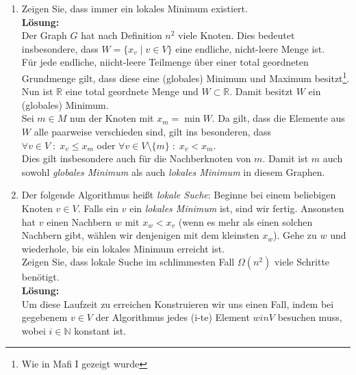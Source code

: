 \documentclass[11pt,a4paper,ngerman]{article}
\begin{document}
\begin{enumerate}[\bfseries (a)]


\item Zeigen Sie, dass immer ein lokales Minimum existiert.\\

\textbf{Lösung:}\\
Der Graph $G$ hat nach Definition $n^2$ viele Knoten. Dies bedeutet insbesondere, dass $W = \{ x_v \; | \; v \in V \}$ eine endliche, nicht-leere Menge ist.\\
Für jede endliche, niicht-leere Teilmenge über einer total geordneten Grundmenge gilt, dass diese eine (globales) Minimum und Maximum besitzt\footnote{Wie in Mafi I gezeigt wurde}. Nun ist $\mathbb{R}$ eine total geordnete Menge und $W \subset \mathbb{R}$. Damit besitzt $W$ ein (globales) Minimum.\\

Sei $m \in M$ nun der Knoten mit $x_m = \min W$. Da gilt, dass die Elemente aus $W$ alle paarweise verschieden sind, gilt ins besonderen, dass\\
$\forall v \in V \; : \; x_v \leq x_m$ oder $\forall v \in V \setminus \{m\} \; : \; x_v < x_m$.\\

Dies gilt insbesondere auch für die Nachberknoten von $m$. Damit ist $m$ auch sowohl \emph{globales Minimum} als auch \emph{lokales Minimum} in diesem Graphen.


\item Der folgende Algorithmus heißt \emph{lokale Suche}: Beginne bei einem beliebigen Knoten $v \in V$. Falls ein $v$ ein \emph{lokales Minimum} ist, sind wir fertig. Ansonsten hat $v$ einen Nachbern $w$ mit $x_w < x_v$ (wenn es mehr als einen solchen Nachbern gibt, wählen wir denjenigen mit dem kleinsten $x_w$). Gehe zu $w$ und wiederhole, bis ein lokales Minimum erreicht ist.\\

Zeigen Sie, dass lokale Suche im schlimmesten Fall $\Omega (n^2)$ viele Schritte benötigt.\\

\textbf{Lösung:}\\
Um diese Laufzeit zu erreichen Konstruieren wir uns einen Fall, indem bei gegebenem $v\in V$ der Algorithmus jedes (i-te) Element $w in V$ besuchen muss, wobei $i\in \mathbb{N}$ konstant ist.\\


\end{enumerate}
\end{document}
